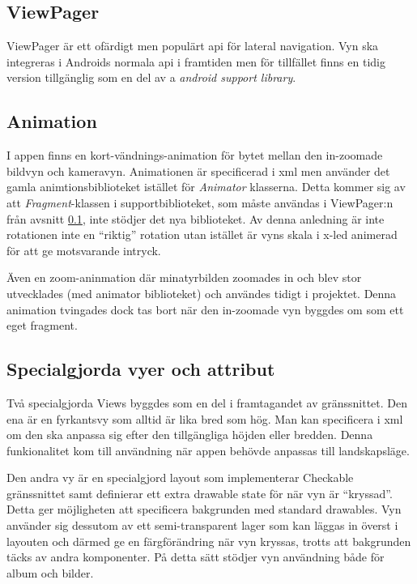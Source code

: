 \documentclass[11px, a4paper, twocolumn]{article}
\begin{document}
\subsection{ViewPager}
\label{subsec:viewpager}
	ViewPager är ett ofärdigt\cite{ViewPager} men populärt api för lateral navigation. Vyn ska integreras i Androids normala api i framtiden men för tillfället finns en tidig version tillgänglig som en del av a \emph{android support library}.

\subsection{Animation}
	I appen finns en kort-vändnings-animation för bytet mellan den in-zoomade bildvyn och kameravyn. Animationen är specificerad i xml men använder det gamla animtionsbiblioteket istället för \emph{Animator} klasserna. Detta kommer sig av att \emph{Fragment}-klassen i supportbiblioteket, som måste användas i ViewPager:n från avsnitt \ref{subsec:viewpager}, inte stödjer det nya biblioteket\cite{SupportAnimator}. Av denna anledning är inte rotationen inte en ``riktig'' rotation utan istället är vyns skala i x-led animerad för att ge motsvarande intryck.

	Även en zoom-aninmation där minatyrbilden zoomades in och blev stor utvecklades (med animator biblioteket) och användes tidigt i projektet. Denna animation tvingades dock tas bort när den in-zoomade vyn byggdes om som ett eget fragment.

\subsection{Specialgjorda vyer och attribut}
	Två specialgjorda Views byggdes som en del i framtagandet av gränssnittet. Den ena är en fyrkantsvy som alltid är lika bred som hög. Man kan specificera i xml om den ska anpassa sig efter den tillgängliga höjden eller bredden. Denna funkionalitet kom till användning när appen behövde anpassas till landskapsläge.

	Den andra vy är en specialgjord layout som implementerar Checkable gränssnittet samt definierar ett extra drawable state för när vyn är ``kryssad''. Detta ger möjligheten att specificera bakgrunden med standard drawables. Vyn använder sig dessutom av ett semi-transparent lager som kan läggas in överst i layouten och därmed ge en färgförändring när vyn kryssas, trotts att bakgrunden täcks av andra komponenter. På detta sätt stödjer vyn användning både för album och bilder.
\end{document}
